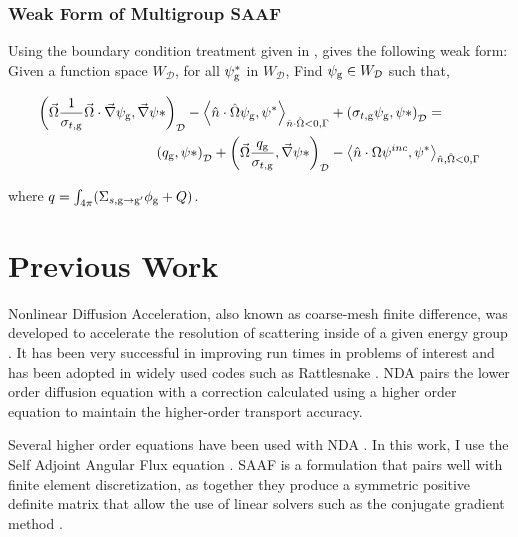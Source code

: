 \subsubsection{Weak Form of Multigroup SAAF}
Using the boundary condition treatment given in \cite{zheng-thesis}, gives the following weak form:
Given a function space $W_\mathcal{D}$, for all $\psi^*_{\mathrm{g}}$ in $W_\mathcal{D}$, Find $\psi_{\mathrm{g}} \in W_\mathcal{D}$ such that,

\begin{equation}
\begin{split}

        \left ( \vec{\Omega}\frac{1}{\sigma_{t, \rg}}\vec{\Omega}\cdot \vec{\nabla}\psi_\rg, \vec{\nabla}\psi* \right)_\mathcal{D} -     \left < \hat{n} \cdot \hat{\Omega}\psi_\rg, \psi^* \right>_{\hat{n} \cdot \hat{\Omega} < 0, \Gamma} &+ \left ( \sigma_{t, \rg} \psi_\rg, \psi* \right )_\mathcal{D} = \\
        \left ( q_\rg, \psi* \right)_\mathcal{D} + \left ( \vec{\Omega} \frac{q_\rg}{\sigma_{t, \rg}}, \vec{\nabla}\psi* \right)_\mathcal{D} &- \left < \hat{n} \cdot {\Omega} \psi^{inc}, \psi^* \right>_{\hat{n}, \hat{\Omega} <0, \Gamma} 
    \end{split}
\end{equation}

where $q = \int_{4\pi}(\Sigma_{s, \mathrm{g} \rightarrow \mathrm{g}'}\phi_{\mathrm{g}} + Q)$. 
\

\section{Previous Work}

Nonlinear Diffusion Acceleration, also known as coarse-mesh finite difference, was developed to accelerate the resolution of scattering inside of a given energy group \cite{Knoll2011} \cite{park-nda}. It has been very successful in improving run times in problems of interest and has been adopted in widely used codes such as Rattlesnake \cite{Wang2013, Schunert2017, morel-holo}. NDA pairs the lower order diffusion equation with a correction calculated using a higher order equation to maintain the higher-order transport accuracy. 

Several higher order equations have been used with NDA \cite{morel-holo, Wang2013}. In this work, I use the Self Adjoint Angular Flux equation \cite{saaf}. SAAF is a formulation that pairs well with finite element discretization, as together they produce a symmetric positive definite matrix that allow the use of linear solvers such as the conjugate gradient method \cite{Shewchuck1994}.

